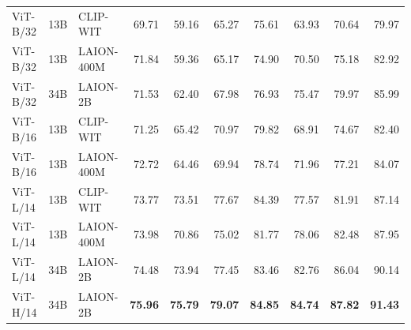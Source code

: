 \begin{appendix}
\begin{table}
\begin{tabular}{lllrrrrrrr}
           ViT-B/32 &                 13B &         CLIP-WIT &    69.71 &                          59.16 &                          65.27 &                          75.61 &             63.93 &             70.64 &             79.97 \\
           ViT-B/32 &                 13B &       LAION-400M &    71.84 &                          59.36 &                          65.17 &                          74.90 &             70.50 &             75.18 &             82.92 \\
           ViT-B/32 &                 34B &         LAION-2B &    71.53 &                          62.40 &                          67.98 &                          76.93 &             75.47 &             79.97 &             85.99 \\
          ViT-B/16 &                 13B &         CLIP-WIT &    71.25 &                          65.42 &                          70.97 &                          79.82 &             68.91 &             74.67 &             82.40 \\
           ViT-B/16 &                 13B &       LAION-400M &    72.72 &                          64.46 &                          69.94 &                          78.74 &             71.96 &             77.21 &             84.07 \\
           ViT-L/14 &                 13B &         CLIP-WIT &    73.77 &                          73.51 &                          77.67 &                          84.39 &             77.57 &             81.91 &             87.14 \\
           ViT-L/14 &                 13B &       LAION-400M &    73.98 &                          70.86 &                          75.02 &                          81.77 &             78.06 &             82.48 &             87.95 \\
           ViT-L/14 &                 34B &         LAION-2B &    74.48 &                          73.94 &                          77.45 &                          83.46 &             82.76 &             86.04 &             90.14 \\
           ViT-H/14 &                 34B &         LAION-2B &    \textbf{75.96} &                          \textbf{75.79} &                          \textbf{79.07} &                          \textbf{84.85} &             \textbf{84.74} &             \textbf{87.82} &             \textbf{91.43} \\

\end{tabular}
\end{table}
\end{appendix}
